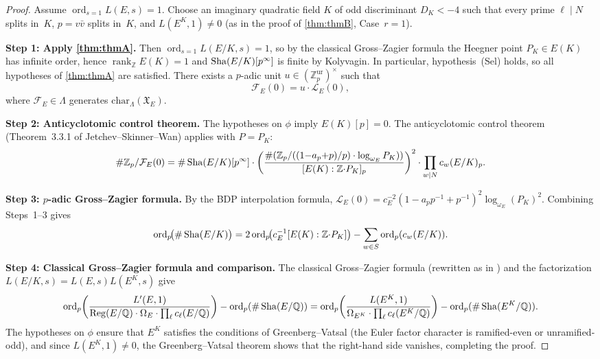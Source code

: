 \begin{proof}
  Assume $\operatorname{ord}_{s=1} L(E, s) = 1$. Choose an imaginary quadratic field $K$
  of odd discriminant $D_K < -4$ such that every prime $\ell \mid N$ splits in~$K$,
  $p = v\bar{v}$ splits in~$K$, and $L(E^K, 1) \neq 0$ (as in the proof of
  \cref{thm:thmB}, Case~$r = 1$).

  \textbf{Step 1: Apply \cref{thm:thmA}.}
  Then $\operatorname{ord}_{s=1} L(E/K, s) = 1$, so by the classical Gross--Zagier
  formula the Heegner point $P_K \in E(K)$ has infinite order, hence
  $\operatorname{rank}_{\mathbb{Z}} E(K) = 1$ and $\operatorname{Sha}(E/K)[p^\infty]$ is finite
  by Kolyvagin. In particular, hypothesis~(Sel) holds, so all hypotheses of
  \cref{thm:thmA} are satisfied. There exists a $p$-adic unit
  $u \in (\mathbb{Z}_p^{\mathrm{ur}})^\times$ such that
  \[
    \mathcal{F}_E(0) = u \cdot \mathcal{L}_E(0),
  \]
  where $\mathcal{F}_E \in \Lambda$ generates $\mathrm{char}_\Lambda(\mathfrak{X}_E)$.

  \textbf{Step 2: Anticyclotomic control theorem.}
  The hypotheses on $\phi$ imply $E(K)[p] = 0$. The anticyclotomic control
  theorem (Theorem~3.3.1 of Jetchev--Skinner--Wan) applies with $P = P_K$:
  \[
    \#\mathbb{Z}_p/\mathcal{F}_E(0)
    = \#\operatorname{Sha}(E/K)[p^\infty] \cdot
      \left(\frac{\#(\mathbb{Z}_p/((1{-}a_p{+}p)/p)\cdot\log_{\omega_E} P_K))}{[E(K):\mathbb{Z}{\cdot}P_K]_p}\right)^2
      \cdot \prod_{w \mid N} c_w(E/K)_p.
  \]

  \textbf{Step 3: $p$-adic Gross--Zagier formula.}
  By the BDP interpolation formula,
  $\mathcal{L}_E(0) = c_E^{-2}(1 - a_p p^{-1} + p^{-1})^2 \log_{\omega_E}(P_K)^2$.
  Combining Steps~1--3 gives
  \[
    \operatorname{ord}_p\!\bigl(\#\operatorname{Sha}(E/K)\bigr)
    = 2\operatorname{ord}_p\!\bigl(c_E^{-1}[E(K):\mathbb{Z}{\cdot}P_K]\bigr)
      - \sum_{w \in S} \operatorname{ord}_p(c_w(E/K)).
  \]

  \textbf{Step 4: Classical Gross--Zagier formula and comparison.}
  The classical Gross--Zagier formula (rewritten as in \cite[p.~312]{grosszagier})
  and the factorization $L(E/K, s) = L(E, s) L(E^K, s)$ give
  \[
    \operatorname{ord}_p\!\left(\frac{L'(E,1)}{\operatorname{Reg}(E/\mathbb{Q})\cdot\Omega_E \cdot \prod_\ell c_\ell(E/\mathbb{Q})}\right)
    - \operatorname{ord}_p(\#\operatorname{Sha}(E/\mathbb{Q}))
    = \operatorname{ord}_p\!\left(\frac{L(E^K,1)}{\Omega_{E^K} \cdot \prod_\ell c_\ell(E^K/\mathbb{Q})}\right)
    - \operatorname{ord}_p(\#\operatorname{Sha}(E^K/\mathbb{Q})).
  \]
  The hypotheses on $\phi$ ensure that $E^K$ satisfies the conditions of
  Greenberg--Vatsal (the Euler factor character is ramified-even or unramified-odd),
  and since $L(E^K, 1) \neq 0$, the Greenberg--Vatsal theorem shows that the
  right-hand side vanishes, completing the proof.
\end{proof}
